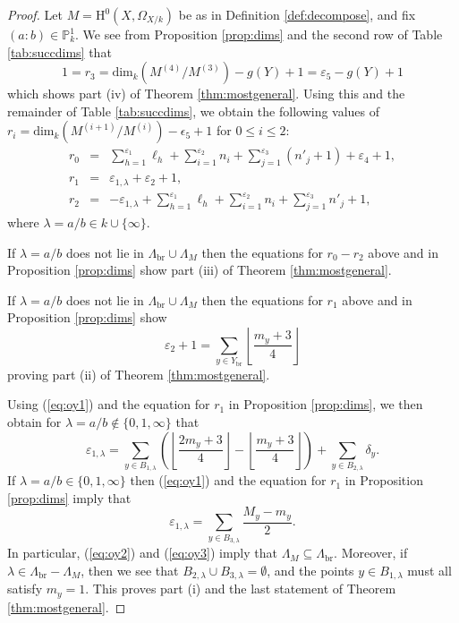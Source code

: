 \documentclass{amsart}
\numberwithin{equation}{section}
\numberwithin{table}{section}
\theoremstyle{plain}
\theoremstyle{definition}
\theoremstyle{remark}
\newcommand{\HH}{\mathrm{H}}
\begin{document}
\begin{proof}
Let $M=\HH^0(X,\Omega_{X/k})$ be as in Definition \ref{def:decompose}, and fix $(a:b)\in\mathbb{P}^1_k$. We see from Proposition \ref{prop:dims} and the second row of Table \ref{tab:succdims} that
$$1=r_3=\mathrm{dim}_k (M^{(4)}/M^{(3)})-g(Y)+1 = \varepsilon_5-g(Y)+1$$
which shows part (iv) of Theorem \ref{thm:mostgeneral}. Using this and the remainder of Table \ref{tab:succdims}, we obtain the following values of $r_i = \mathrm{dim}_k (M^{(i+1)}/M^{(i)})-\epsilon_5+1$ for $0\le i\le 2$:
\begin{eqnarray*}
r_0 &=& \sum_{h=1}^{\varepsilon_1}  \ell_h + \sum_{i=1}^{\varepsilon_2} n_i +\sum_{j=1}^{\varepsilon_3} (n'_j+1) + \varepsilon_4 + 1 ,\\[2ex]
r_1 &=& \varepsilon_{1,\lambda} + \varepsilon_2 + 1 
,\\[2ex]
r_2 &=& \displaystyle -\varepsilon_{1,\lambda} + \sum_{h=1}^{\varepsilon_1} \ell_h +  \sum_{i=1}^{\varepsilon_2} n_i +\sum_{j=1}^{\varepsilon_3} n'_j + 1, 
\end{eqnarray*}
where $\lambda=a/b\in k\cup\{\infty\}$.

If 
$\lambda=a/b$ does not lie in $\Lambda_{\mathrm{br}}\cup\Lambda_M$
then the equations for $r_0-r_2$ above and in Proposition \ref{prop:dims} show part (iii) of Theorem \ref{thm:mostgeneral}.

If 
$\lambda=a/b$ does not lie in $\Lambda_{\mathrm{br}}\cup\Lambda_M$
then the equations for $r_1$ above and in Proposition \ref{prop:dims} show 
\begin{equation}
\label{eq:oy1}
\varepsilon_2 + 1 = \sum_{y\in Y_{\mathrm{br}}} \left\lfloor\frac{m_y+3}{4}\right\rfloor
\end{equation}
proving part (ii) of Theorem \ref{thm:mostgeneral}. 

Using (\ref{eq:oy1}) and the equation for $r_1$ in Proposition \ref{prop:dims}, we then obtain for 
$\lambda=a/b\not\in\{0,1,\infty\}$
that
\begin{equation}
\label{eq:oy2}
\varepsilon_{1,\lambda} = \sum_{y\in B_{1,\lambda}}\left(\left\lfloor \frac{2m_y+3}{4}\right\rfloor - \left\lfloor \frac{m_y+3}{4}\right\rfloor \right) + \sum_{y\in B_{2,\lambda}}\delta_y.
\end{equation}
If 
$\lambda=a/b\in\{0,1,\infty\}$
then (\ref{eq:oy1}) and the equation for $r_1$ in Proposition \ref{prop:dims} imply that
\begin{equation}
\label{eq:oy3}
\varepsilon_{1,\lambda} = \sum_{y\in B_{3,\lambda}}\frac{M_y-m_y}{2} .
\end{equation}
In particular, (\ref{eq:oy2}) and (\ref{eq:oy3}) imply that $\Lambda_M\subseteq \Lambda_{\mathrm{br}}$. Moreover, if $\lambda\in\Lambda_{\mathrm{br}}-\Lambda_M$, then we see that
$B_{2,\lambda}\cup B_{3,\lambda}=\emptyset$, and the points $y\in B_{1,\lambda}$ must all satisfy $m_y=1$. This proves part (i) and the last statement of Theorem \ref{thm:mostgeneral}.
\end{proof}
\end{document}
